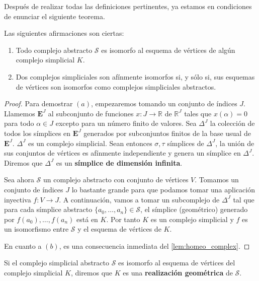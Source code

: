 Después de realizar todas las definiciones pertinentes, ya estamos en condiciones de enunciar el 
siguiente teorema.

\begin{teorema}
	Las siguientes afirmaciones son ciertas:
	\begin{enumerate}[label=(\alph*)]
		\item Todo complejo abstracto $\mathcal{S}$ es isomorfo al esquema de vértices de algún 
		complejo simplicial $K$.
		\item Dos complejos simpliciales son afínmente isomorfos si, y sólo si, sus esquemas 
		de vértices son isomorfos como complejos simpliciales abstractos.
	\end{enumerate}
\end{teorema}
\begin{proof}
	Para demostrar $(a)$, empezaremos tomando un conjunto de índices $J$. Llamemos $\mathbf{E}^J$ 
	al subconjunto de funciones $x: J \rightarrow \mathbb{R}$ de $\mathbb{R}^J$ tales que $x(\alpha) = 0$ 
	para todo $\alpha \in J$ excepto para un número finito de valores. Sea $\Delta^J$ la 
	colección de todos los símplices en $\mathbf{E}^J$ generados por subconjuntos finitos de 
	la base usual de $\mathbf{E}^J$. $\Delta^J$ es un complejo simplicial. 
	Sean entonces $\sigma, \tau$ símplices de $\Delta^J$, la 
	unión de sus conjuntos de vértices es afínmente independiente y genera un símplice en $\Delta^J$.
	Diremos que $\Delta^J$ es un \textbf{símplice de dimensión infinita}.
	
	Sea ahora $\mathcal{S}$ un complejo abstracto con conjunto de vértices $V$. Tomamos un conjunto 
	de índices $J$ lo bastante grande para que podamos tomar una aplicación inyectiva 
	$f: V \rightarrow J$. A continuación, vamos a tomar un subcomplejo de $\Delta^J$ tal que para 
	cada símplice abstracto $\{a_0, \dots, a_n\} \in \mathcal{S}$, el símplice (geométrico) generado 
	por $f(a_0), \dots, f(a_n)$ está en $K$. Por tanto $K$ es un complejo simplicial y 
	$f$ es un isomorfismo entre $\mathcal{S}$ y el esquema de vértices de $K$.
	
	En cuanto a $(b)$, es una consecuencia inmediata del \autoref{lem:homeo_complex}.
\end{proof}

\begin{definicion}
	Si el complejo simplicial abstracto $\mathcal{S}$ es isomorfo al esquema de vértices del 
	complejo simplicial $K$, diremos que $K$ es una \textbf{realización geométrica} de $\mathcal{S}$.
\end{definicion}


\endinput
